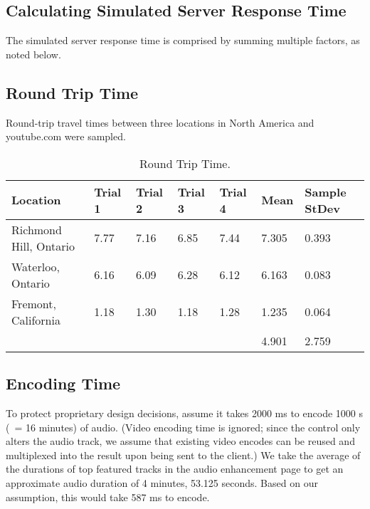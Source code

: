 \documentclass[se,resubmit]{uw-wkrpt}
\begin{document}
\appendix
\begin{appendices}

\section{Calculating Simulated Server Response Time}\label{app:calculating}
The simulated server response time is comprised by summing multiple factors, as
noted below.

\subsection{Round Trip Time}
Round-trip travel times between three locations in North America and youtube.com
were sampled.

\begin{table}
  \caption{Round Trip Time.}
  \label{tbl:rtt}
  \centering
  \begin{tabular}{|p{2.0cm}|p{2.0cm}|p{2.0cm}|p{2.0cm}|p{2.0cm}|p{2.0cm}|
                   p{2.0cm}|}
    \hline
    \textbf{Location} &
    \textbf{Trial 1} &
    \textbf{Trial 2} &
    \textbf{Trial 3} &
    \textbf{Trial 4} &
    \textbf{Mean} &
    \textbf{Sample StDev} \\
    \hline
    Richmond Hill, Ontario &
      7.77 & 7.16 & 6.85 & 7.44 & 7.305 & 0.393 \\
    Waterloo, Ontario &
      6.16 & 6.09 & 6.28 & 6.12 & 6.163 & 0.083 \\
    Fremont, California &
      1.18 & 1.30 & 1.18 & 1.28 & 1.235 & 0.064 \\
    \hline
    \multicolumn{5}{p{10.0cm}}{} & 4.901 & 2.759 \\
    \hline
  \end{tabular}
\end{table}

\subsection{Encoding Time}
To protect proprietary design decisions, assume it takes 2000 ms to encode 1000
s (~= 16 minutes) of audio. (Video encoding time is ignored; since the control
only alters the audio track, we assume that existing video encodes can be reused
and multiplexed into the result upon being sent to the client.) We take the
average of the durations of top featured tracks in the audio enhancement page to
get an approximate audio duration of 4 minutes, 53.125 seconds. Based on our
assumption, this would take 587 ms to encode.


\end{appendices}
\end{document}
